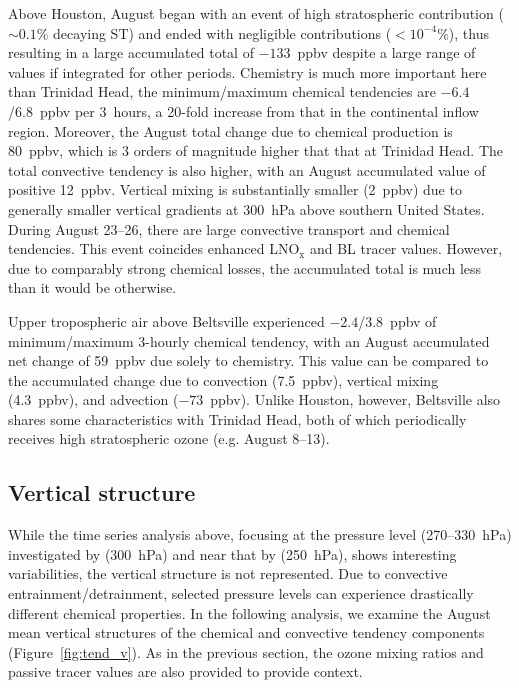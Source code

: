 Above Houston, August began with an event of high stratospheric contribution ($\sim0.1\%$ decaying ST)
and ended with negligible contributions ($<10^{-4}\%$), thus resulting in a large accumulated total
of $-133$~ppbv despite a large range of values if integrated for other periods.
Chemistry is much more important here than Trinidad Head, the minimum/maximum chemical tendencies
are $-6.4$/6.8~ppbv per 3~hours, a 20-fold increase from that in the continental inflow region.
Moreover, the August total change due to chemical production is 80~ppbv, which is 3 orders
of magnitude higher that that at Trinidad Head. The total convective tendency is also higher, with an
August accumulated value of positive 12~ppbv. Vertical mixing is substantially smaller (2~ppbv)
due to generally smaller vertical gradients at 300~hPa above southern United States. During
August 23--26,  there are large convective transport and chemical tendencies. This event coincides
enhanced LNO$_{\mathrm{x}}$ and BL tracer values. However, due to comparably strong
chemical losses, the accumulated total is much less than it would be otherwise.

Upper tropospheric air above Beltsville experienced $-2.4$/3.8~ppbv of minimum/maximum 3-hourly chemical
tendency, with an August accumulated net change of 59~ppbv due solely to chemistry.
This value can be compared to the accumulated change due to convection
(7.5~ppbv), vertical mixing (4.3~ppbv), and advection ($-73$~ppbv). Unlike Houston, however,
Beltsville also shares some characteristics with Trinidad Head, both of which periodically
receives high stratospheric ozone (e.g. August 8--13).

\subsection{Vertical structure}

While the time series analysis above, focusing at the pressure level (270--330~hPa) investigated by \citet{Li:2005ss}
(300~hPa) and near that by \citet{Cooper:2007cr} (250~hPa), shows interesting variabilities,
the vertical structure is not represented. Due to convective entrainment/detrainment, selected
pressure levels can experience drastically different chemical properties. In the following
analysis, we examine the August mean vertical structures of the chemical and convective
tendency components (Figure~\ref{fig:tend_v}). As in the previous section, the ozone
mixing ratios and passive tracer values are also provided to provide context.

